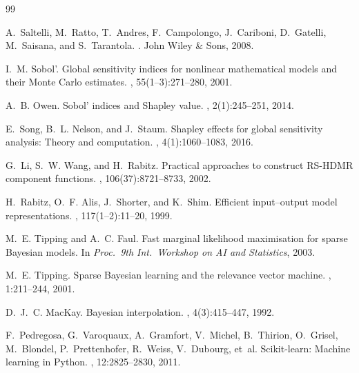 \documentclass[11pt,a4paper]{article}
\begin{document}
\begin{thebibliography}{99}

A.~Saltelli, M.~Ratto, T.~Andres, F.~Campolongo, J.~Cariboni, D.~Gatelli, M.~Saisana, and S.~Tarantola.
.
\newblock John Wiley \& Sons, 2008.

I.~M. Sobol'.
\newblock Global sensitivity indices for nonlinear mathematical models and their Monte Carlo estimates.
, 55(1--3):271--280, 2001.

A.~B. Owen.
\newblock Sobol' indices and Shapley value.
, 2(1):245--251, 2014.

E.~Song, B.~L. Nelson, and J.~Staum.
\newblock Shapley effects for global sensitivity analysis: Theory and computation.
, 4(1):1060--1083, 2016.

G.~Li, S.~W. Wang, and H.~Rabitz.
\newblock Practical approaches to construct RS-HDMR component functions.
, 106(37):8721--8733, 2002.

H.~Rabitz, O.~F. Alis, J.~Shorter, and K.~Shim.
\newblock Efficient input--output model representations.
, 117(1--2):11--20, 1999.

M.~E. Tipping and A.~C. Faul.
\newblock Fast marginal likelihood maximisation for sparse Bayesian models.
\newblock In {\em Proc.\ 9th Int.\ Workshop on AI and Statistics}, 2003.

M.~E. Tipping.
\newblock Sparse Bayesian learning and the relevance vector machine.
, 1:211--244, 2001.

D.~J.~C. MacKay.
\newblock Bayesian interpolation.
, 4(3):415--447, 1992.

F.~Pedregosa, G.~Varoquaux, A.~Gramfort, V.~Michel, B.~Thirion, O.~Grisel, M.~Blondel, P.~Prettenhofer, R.~Weiss, V.~Dubourg, et~al.
\newblock Scikit-learn: Machine learning in Python.
, 12:2825--2830, 2011.


\end{thebibliography}
\end{document}

